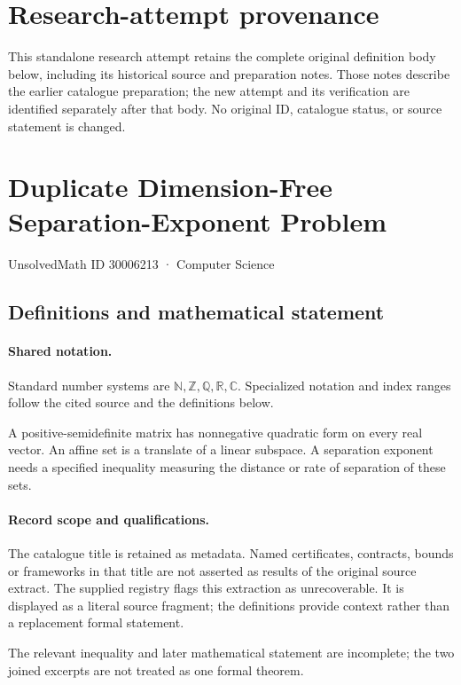 \documentclass[11pt]{article}
\begin{document}
\section*{Research-attempt provenance}
This standalone research attempt retains the complete original definition body below,
including its historical source and preparation notes. Those notes describe the
earlier catalogue preparation; the new attempt and its verification are identified
separately after that body. No original ID, catalogue status, or source statement is changed.

\section{Duplicate Dimension-Free Separation-Exponent Problem}\label{30006213}
{\small UnsolvedMath ID 30006213 · Computer Science}
\subsection{Definitions and mathematical statement}

\paragraph{Shared notation.}Standard number systems are $\mathbb N,\mathbb Z,\mathbb Q,\mathbb R,\mathbb C$. Specialized notation and index ranges follow the cited source and the definitions below.


A positive-semidefinite matrix has nonnegative quadratic form on every real vector. An affine set is a translate of a linear subspace. A separation exponent needs a specified inequality measuring the distance or rate of separation of these sets.
\paragraph{Record scope and qualifications.}
The catalogue title is retained as metadata. Named certificates, contracts, bounds or frameworks in that title are not asserted as results of the original source extract.
The supplied registry flags this extraction as unrecoverable. It is displayed as a literal source fragment; the definitions provide context rather than a replacement formal statement.

The relevant inequality and later mathematical statement are incomplete; the two joined excerpts are not treated as one formal theorem.
\end{document}
